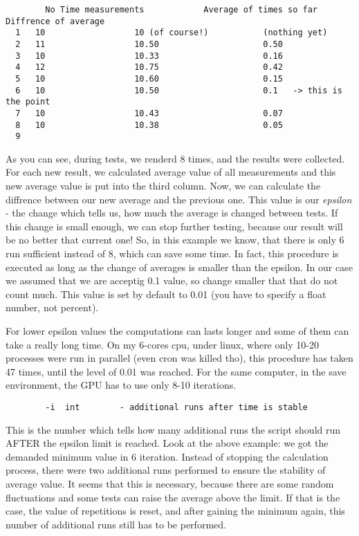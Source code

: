 \documentclass{article}
\begin{document}
\begin{verbatim}
        No Time measurements            Average of times so far         Diffrence of average
  1   10                  10 (of course!)           (nothing yet)
  2   11                  10.50                     0.50
  3   10                  10.33                     0.16
  4   12                  10.75                     0.42
  5   10                  10.60                     0.15
  6   10                  10.50                     0.1   -> this is the point
  7   10                  10.43                     0.07
  8   10                  10.38                     0.05
  9
\end{verbatim}


As you can see, during tests, we renderd 8 times, and the results were
collected. For each new result, we calculated average value of all measurements
and this new average value is put into the third column. Now, we can calculate
the diffrence between our new average and the previous one. This value is our
\textit{epsilon} - the change which tells us, how much the average is changed between
tests. If this change is small enough, we can stop further testing, because
our result will be no better that current one! So, in this example we know,
that there is only 6 run sufficient instead of 8, which can save some time. In
fact, this procedure is executed as long as the change of averages is smaller
than the epsilon. In our case we assumed that we are acceptig 0.1 value, so
change smaller that that do not count much. This value is set by default to
0.01 (you have to specify a float number, not percent).



For lower epsilon values the computations can lasts longer and some of them can
take a really long time. On my 6-cores cpu, under linux, where only 10-20 
processes were run in parallel (even cron was killed tho), this procedure has
taken 47 times, until the level of 0.01 was reached. For the same computer, in
the save environment, the GPU has to use only 8-10 iterations.

\begin{verbatim}
        -i  int        - additional runs after time is stable
\end{verbatim}


This is the number which tells how many additional runs the script should run
AFTER the epsilon limit is reached. Look at the above example: we got the
demanded minimum value in 6 iteration. Instead of stopping the calculation
process, there were two additional runs performed to ensure the stability of 
average value. It seems that this is necessary, because there are some random
fluctuations and some tests can raise the average above the limit. If that is
the case, the value of repetitions is reset, and after gaining the minimum
again, this number of additional runs still has to be performed.
\end{document}

